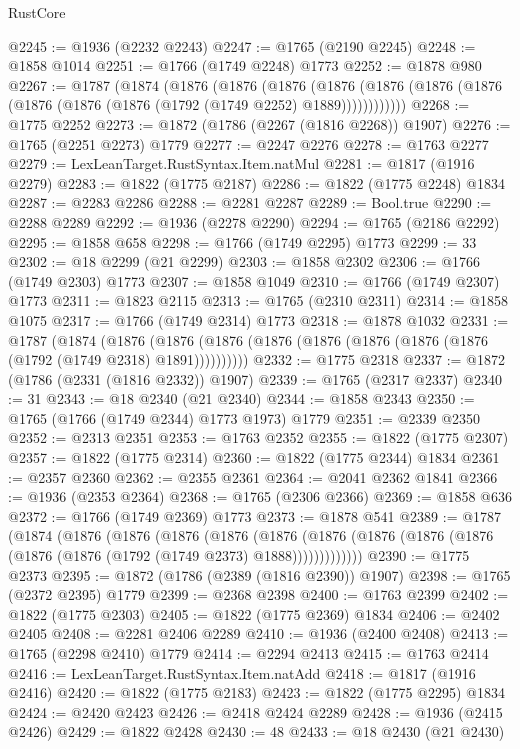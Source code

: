 \begin{lexlean}{RustCore}
\begin{coremodule}
@2245 := @1936 (@2232 @2243)
@2247 := @1765 (@2190 @2245)
@2248 := @1858 @1014
@2251 := @1766 (@1749 @2248) @1773
@2252 := @1878 @980
@2267 := @1787
    (@1874
      (@1876
        (@1876
          (@1876
            (@1876 (@1876 (@1876 (@1876 (@1876 (@1876 (@1876 (@1792 (@1749 @2252) @1889))))))))))))
@2268 := @1775 @2252
@2273 := @1872 (@1786 (@2267 (@1816 @2268)) @1907)
@2276 := @1765 (@2251 @2273) @1779
@2277 := @2247 @2276
@2278 := @1763 @2277
@2279 := LexLeanTarget.RustSyntax.Item.natMul
@2281 := @1817 (@1916 @2279)
@2283 := @1822 (@1775 @2187)
@2286 := @1822 (@1775 @2248) @1834
@2287 := @2283 @2286
@2288 := @2281 @2287
@2289 := Bool.true
@2290 := @2288 @2289
@2292 := @1936 (@2278 @2290)
@2294 := @1765 (@2186 @2292)
@2295 := @1858 @658
@2298 := @1766 (@1749 @2295) @1773
@2299 := 33
@2302 := @18 @2299 (@21 @2299)
@2303 := @1858 @2302
@2306 := @1766 (@1749 @2303) @1773
@2307 := @1858 @1049
@2310 := @1766 (@1749 @2307) @1773
@2311 := @1823 @2115
@2313 := @1765 (@2310 @2311)
@2314 := @1858 @1075
@2317 := @1766 (@1749 @2314) @1773
@2318 := @1878 @1032
@2331 := @1787
    (@1874
      (@1876 (@1876 (@1876 (@1876 (@1876 (@1876 (@1876 (@1876 (@1792 (@1749 @2318) @1891))))))))))
@2332 := @1775 @2318
@2337 := @1872 (@1786 (@2331 (@1816 @2332)) @1907)
@2339 := @1765 (@2317 @2337)
@2340 := 31
@2343 := @18 @2340 (@21 @2340)
@2344 := @1858 @2343
@2350 := @1765 (@1766 (@1749 @2344) @1773 @1973) @1779
@2351 := @2339 @2350
@2352 := @2313 @2351
@2353 := @1763 @2352
@2355 := @1822 (@1775 @2307)
@2357 := @1822 (@1775 @2314)
@2360 := @1822 (@1775 @2344) @1834
@2361 := @2357 @2360
@2362 := @2355 @2361
@2364 := @2041 @2362 @1841
@2366 := @1936 (@2353 @2364)
@2368 := @1765 (@2306 @2366)
@2369 := @1858 @636
@2372 := @1766 (@1749 @2369) @1773
@2373 := @1878 @541
@2389 := @1787
    (@1874
      (@1876
        (@1876
          (@1876
            (@1876
              (@1876
                (@1876 (@1876 (@1876 (@1876 (@1876 (@1876 (@1792 (@1749 @2373) @1888)))))))))))))
@2390 := @1775 @2373
@2395 := @1872 (@1786 (@2389 (@1816 @2390)) @1907)
@2398 := @1765 (@2372 @2395) @1779
@2399 := @2368 @2398
@2400 := @1763 @2399
@2402 := @1822 (@1775 @2303)
@2405 := @1822 (@1775 @2369) @1834
@2406 := @2402 @2405
@2408 := @2281 @2406 @2289
@2410 := @1936 (@2400 @2408)
@2413 := @1765 (@2298 @2410) @1779
@2414 := @2294 @2413
@2415 := @1763 @2414
@2416 := LexLeanTarget.RustSyntax.Item.natAdd
@2418 := @1817 (@1916 @2416)
@2420 := @1822 (@1775 @2183)
@2423 := @1822 (@1775 @2295) @1834
@2424 := @2420 @2423
@2426 := @2418 @2424 @2289
@2428 := @1936 (@2415 @2426)
@2429 := @1822 @2428
@2430 := 48
@2433 := @18 @2430 (@21 @2430)

\end{coremodule}
\end{lexlean}
